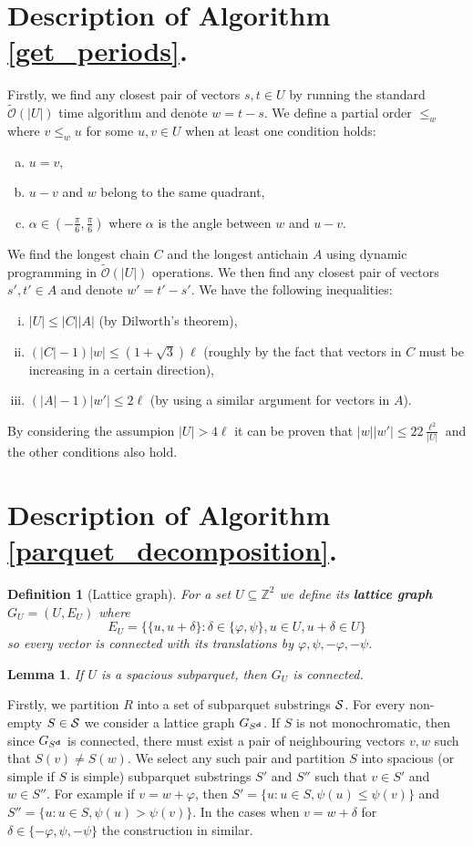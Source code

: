 \documentclass[a4paper]{article}
\newcommand{\Z}{\mathbb{Z}}
\newcommand{\tO}{\tilde{\mathcal{O}}}
\renewcommand{\phi}{\varphi}
\newcommand{\set}[1]{\lbrace #1 \rbrace}
\newcommand{\bigset}[1]{\big \lbrace #1 \big \rbrace}
\newtheorem{definition}{Definition}
\newtheorem{lemma}{Lemma}[definition]
\begin{document}
\section{Description of Algorithm \ref{get_periods}.}
Firstly, we find any closest pair of vectors $s, t \in U$ by running the standard $\tO(|U|)$ time algorithm and denote $w = t - s$.
We define a partial order $\le_{w}$ where $v \le_w u$ for some $u, v \in U$ when at least one condition holds:
\begin{enumerate}[(a)]
	\item $u = v$,
	\item $u - v$ and $w$ belong to the same quadrant,
	\item $\alpha \in (-\frac{\pi}{6}, \frac{\pi}{6})$ where $\alpha$ is the angle between $w$ and $u - v$.
\end{enumerate}
We find the longest chain $C$ and the longest antichain $A$ using dynamic programming in $\tO(|U|)$ operations.
We then find any closest pair of vectors $s', t' \in A$ and denote $w' = t' - s'$.
We have the following inequalities:
\begin{enumerate}[(i)]
	\item $|U| \le |C| |A|$ (by Dilworth's theorem),
	\item $(|C| - 1) |w| \le (1 + \sqrt{3})\ell$ (roughly by the fact that vectors in $C$ must be increasing in a certain direction), 
	\item $(|A| - 1) |w'| \le 2 \ell$ (by using a similar argument for vectors in $A$).
\end{enumerate}
By considering the assumpion $|U| > 4\ell$ it can be proven that $|w||w'| \le 22 \frac{\ell^2}{|U|}$ and the other conditions also hold.


\section{Description of Algorithm \ref{parquet_decomposition}.}
\begin{definition}[Lattice graph]
	For a set $U \subseteq \Z^2$ we define its \textbf{lattice graph} $G_U = (U, E_U)$ where
	$$ E_U = \bigset{\set{u, u + \delta} : \delta \in \set{\phi, \psi}, u \in U, u + \delta \in U} $$ 
	so every vector is connected with its translations by $\phi, \psi, -\phi, -\psi$.
\end{definition}
\begin{lemma}
	If $U$ is a spacious subparquet, then $G_U$ is connected.
\end{lemma}
Firstly, we partition $R$ into a set of subparquet substrings $\S$.
For every non-empty $S \in \S$ we consider a lattice graph $G_{\d{S}}$. If $S$ is not monochromatic, then since $G_{\d{S}}$ is connected, there must exist a pair of neighbouring vectors $v, w$ such that $S(v) \neq S(w)$.
We select any such pair and partition $S$ into spacious (or simple if $S$ is simple) subparquet substrings $S'$ and $S''$ such that $v \in S'$ and $w \in S''$.
For example if $v = w + \phi$, then $S' = \set{u : u \in S, \psi(u) \le \psi(v)}$ and $S'' = \set{u : u \in S, \psi(u) > \psi(v)}$.
In the cases when $v = w + \delta$ for $\delta \in \set{-\phi, \psi, -\psi}$ the construction in similar.
\end{document}

